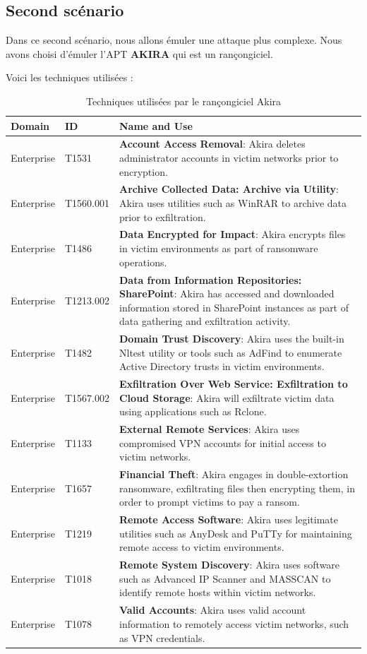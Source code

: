 \documentclass[12pt,letterpaper]{article}
\begin{document}
\subsection{Second scénario}

Dans ce second scénario, nous allons émuler une attaque plus complexe.
Nous avons choisi d'émuler l'APT \textbf{AKIRA} qui est un rançongiciel.

Voici les techniques utilisées :
\begin{table}[h!]
    \centering
    \begin{tabular}{|l|l|p{10cm}|}
        \hline
        \textbf{Domain} & \textbf{ID} & \textbf{Name and Use} \\ \hline
        Enterprise & T1531 & \textbf{Account Access Removal}: Akira deletes administrator accounts in victim networks prior to encryption. \\ \hline
        Enterprise & T1560.001 & \textbf{Archive Collected Data: Archive via Utility}: Akira uses utilities such as WinRAR to archive data prior to exfiltration. \\ \hline
        Enterprise & T1486 & \textbf{Data Encrypted for Impact}: Akira encrypts files in victim environments as part of ransomware operations. \\ \hline
        Enterprise & T1213.002 & \textbf{Data from Information Repositories: SharePoint}: Akira has accessed and downloaded information stored in SharePoint instances as part of data gathering and exfiltration activity. \\ \hline
        Enterprise & T1482 & \textbf{Domain Trust Discovery}: Akira uses the built-in Nltest utility or tools such as AdFind to enumerate Active Directory trusts in victim environments. \\ \hline
        Enterprise & T1567.002 & \textbf{Exfiltration Over Web Service: Exfiltration to Cloud Storage}: Akira will exfiltrate victim data using applications such as Rclone. \\ \hline
        Enterprise & T1133 & \textbf{External Remote Services}: Akira uses compromised VPN accounts for initial access to victim networks. \\ \hline
        Enterprise & T1657 & \textbf{Financial Theft}: Akira engages in double-extortion ransomware, exfiltrating files then encrypting them, in order to prompt victims to pay a ransom. \\ \hline
        Enterprise & T1219 & \textbf{Remote Access Software}: Akira uses legitimate utilities such as AnyDesk and PuTTy for maintaining remote access to victim environments. \\ \hline
        Enterprise & T1018 & \textbf{Remote System Discovery}: Akira uses software such as Advanced IP Scanner and MASSCAN to identify remote hosts within victim networks. \\ \hline
        Enterprise & T1078 & \textbf{Valid Accounts}: Akira uses valid account information to remotely access victim networks, such as VPN credentials. \\ \hline
    \end{tabular}
    \caption{Techniques utilisées par le rançongiciel Akira}
    \label{tab:akira_techniques}
\end{table}
\end{document}
